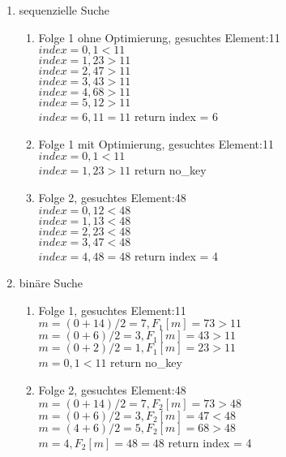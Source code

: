 \documentclass[12pt]{scrartcl}
\begin{document}
\begin{enumerate}
  \item sequenzielle Suche
    \begin{enumerate}
      \item Folge 1 ohne Optimierung, gesuchtes Element:11\\
        $index = 0, 1 < 11$ \\
        $index = 1, 23 > 11$ \\
        $index = 2, 47 > 11$ \\
        $index = 3, 43 > 11$ \\
        $index = 4, 68 > 11$ \\
        $index = 5, 12 > 11$ \\
        $index = 6, 11 = 11$ return index = 6
      \item Folge 1 mit Optimierung, gesuchtes Element:11\\
        $index = 0, 1 < 11$ \\
        $index = 1, 23 > 11$ return no\_key
      \item Folge 2, gesuchtes Element:48\\
        $index = 0, 12 < 48$ \\
        $index = 1, 13 < 48$ \\
        $index = 2, 23 < 48$ \\
        $index = 3, 47 < 48$ \\
        $index = 4, 48 = 48$  return index = 4 \\
    \end{enumerate}
  \item binäre Suche
    \begin{enumerate}
      \item Folge 1, gesuchtes Element:11\\
        $m = (0 + 14)/2 = 7, F_1[m] = 73 > 11$ \\
        $m = (0 + 6)/2 = 3, F_1[m] = 43 > 11$ \\
        $m = (0 + 2)/2 = 1, F_1[m] = 23 > 11$ \\
        $m = 0, 1 < 11$ return no\_key
      \item Folge 2, gesuchtes Element:48\\
        $m = (0 + 14)/2 = 7, F_2[m] = 73 > 48$ \\
        $m = (0 + 6)/2 = 3, F_2[m] = 47 < 48$ \\
        $m = (4 + 6)/2 = 5, F_2[m] = 68 > 48$ \\
        $m = 4, F_2[m] = 48 = 48$ return index = 4
    \end{enumerate}
\end{enumerate}
\end{document}
